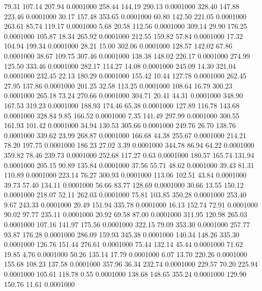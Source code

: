   79.31  107.14  207.94   0.0001000
 258.44  144.19  290.13   0.0001000
 328.40  147.88  223.46   0.0001000
  30.17  157.48  353.65   0.0001000
  60.80  142.50  221.05   0.0001000
 263.61   85.74  119.17   0.0001000
   5.68   20.58  112.56   0.0001000
 309.14   29.90  176.25   0.0001000
 105.87   18.34  265.92   0.0001000
 212.55  159.82   57.84   0.0001000
  17.32  104.94  199.34   0.0001000
  28.21   15.00  302.06   0.0001000
 128.57  142.02   67.86   0.0001000
  38.67  109.75  307.46   0.0001000
 138.38  148.02  226.17   0.0001000
 274.99  125.50  333.46   0.0001000
 282.17  114.27   14.08   0.0001000
 245.09   14.30  321.04   0.0001000
 232.45   22.13  180.29   0.0001000
 155.42   10.44  127.78   0.0001000
 262.45   27.95  137.86   0.0001000
 201.25   32.58  113.25   0.0001000
 108.64   16.79  300.23   0.0001000
 265.18   73.24  270.66   0.0001000
 304.71   20.41   44.31   0.0001000
 348.90  167.53  319.23   0.0001000
 188.93  174.46   65.38   0.0001000
 127.89  116.78  143.68   0.0001000
 328.84    9.85  166.52   0.0001000
   7.35  141.49  297.99   0.0001000
 300.55  161.93  101.42   0.0001000
  34.94  130.53  305.66   0.0001000
 249.76   26.70  138.76   0.0001000
 339.62   23.99  268.87   0.0001000
 166.68   44.38  255.67   0.0001000
 214.21   78.20  197.75   0.0001000
 186.23   27.02    3.39   0.0001000
 344.78   86.94   64.22   0.0001000
 359.82   78.46  239.73   0.0001000
 252.68  117.27    0.63   0.0001000
 180.57  165.74  131.94   0.0001000
 205.15   90.89  135.84   0.0001000
  37.56   55.71   48.62   0.0001000
  39.43   81.31  110.89   0.0001000
 223.14   76.27  300.93   0.0001000
 113.06  102.51   43.84   0.0001000
  39.73   57.40  134.11   0.0001000
  56.66   83.77  128.69   0.0001000
  30.66   13.55  150.12   0.0001000
 218.07   52.11  262.03   0.0001000
  75.81  103.85  350.28   0.0001000
 253.40    9.67  243.33   0.0001000
  20.49  151.94  335.78   0.0001000
  16.13  152.74   72.91   0.0001000
  90.02   97.77  235.11   0.0001000
  20.92   69.58   87.00   0.0001000
 311.95  120.98  265.03   0.0001000
 107.16  141.97  175.56   0.0001000
 322.15   79.09  353.30   0.0001000
 257.77   93.87  176.28   0.0001000
 286.09  159.93  345.38   0.0001000
 140.34  148.26  335.30   0.0001000
 126.76  151.44  276.61   0.0001000
  75.44  132.14   45.44   0.0001000
  71.62   19.85    4.76   0.0001000
  50.26  135.14   17.79   0.0001000
   6.07   13.70  220.26   0.0001000
 155.68  108.23  137.58   0.0001000
 357.96   36.34  232.74   0.0001000
 229.57   70.20  225.94   0.0001000
 105.61  118.78    0.55   0.0001000
 138.68  148.65  355.24   0.0001000
 129.90  150.76   11.61   0.0001000
